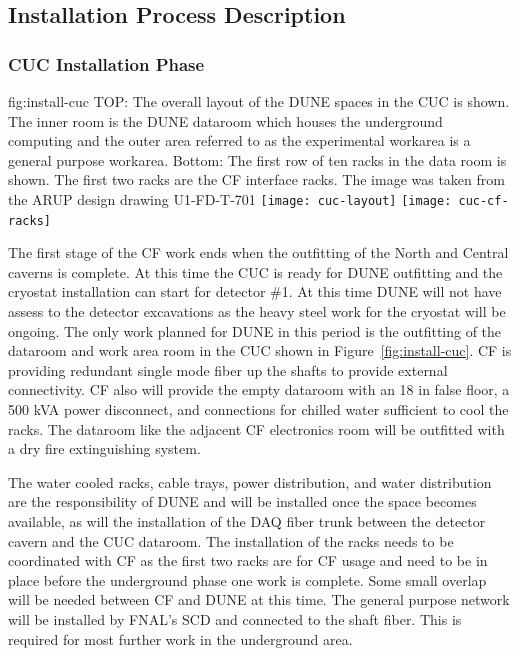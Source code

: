 \subsection{Installation Process Description}
\label{sec:fdsp-tc-inst-proc}

\subsubsection{CUC Installation Phase}

\begin{dunefigure}{fig:install-cuc}
  {TOP: The overall layout of the DUNE spaces in the CUC is shown. The inner room is the DUNE dataroom which houses the underground computing and the outer area referred to as the experimental workarea is a general purpose workarea. Bottom: The first row of ten racks in the data room is shown. The first two racks are the  CF interface racks. The image was taken from the ARUP design drawing U1-FD-T-701}
\texttt{[image: cuc-layout]}
\texttt{[image: cuc-cf-racks]}
\end{dunefigure}


The first stage of the CF work ends when the outfitting of the North and Central caverns is complete. At this time the CUC is ready for DUNE outfitting and the cryostat installation can start for detector \#1. At this time DUNE will not have assess to the detector excavations as the heavy steel work for the cryostat will be ongoing. The only work planned for DUNE in this period is the outfitting of the dataroom and work area room in the CUC shown in Figure~\ref{fig:install-cuc}.  CF is providing redundant single mode fiber up the shafts to provide external connectivity.  CF also will provide the empty dataroom with an 18 \si{in} false floor, a 500 \si{kVA} power disconnect, and connections for chilled water sufficient to cool the racks. The dataroom like the adjacent CF electronics room will be outfitted with a dry fire extinguishing system. 

The water cooled racks, cable trays, power distribution, and water distribution are the responsibility of DUNE and will be installed once the space becomes available, as will the installation of the DAQ fiber trunk between the detector cavern and the CUC dataroom. The installation of the racks needs to be coordinated with CF as the first two racks are for CF usage and need to be in place before the underground phase one work is complete. Some small overlap will be needed between CF and DUNE at this time. The general purpose network will be installed by FNAL's SCD and connected to the shaft fiber. This is required for most further work in the underground area.

